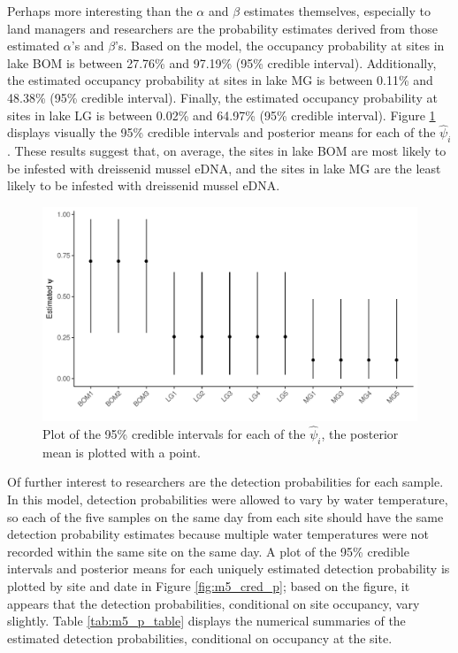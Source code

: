 \documentclass[12pt]{article}\usepackage[]{graphicx}\usepackage[]{color}
\makeatletter
\def\maxwidth{ %
  \ifdim\Gin@nat@width>\linewidth
    \linewidth
  \else
    \Gin@nat@width
  \fi
}
\newenvironment{knitrout}{}{} %
\def\maxwidth{ %
  \ifdim\Gin@nat@width>\linewidth
    \linewidth
  \else
    \Gin@nat@width
  \fi
}
\newenvironment{knitrout}{}{} %
\makeatother
\begin{document}
Perhaps more interesting than the $\alpha$ and $\beta$ estimates themselves, especially to land managers and researchers are the probability estimates derived from those estimated $\alpha$'s and $\beta$'s. Based on the model, the occupancy probability at sites in lake BOM is between 27.76\% and 97.19\% (95\% credible interval). Additionally, the estimated occupancy probability at sites in lake MG is between 0.11\% and 48.38\% (95\% credible interval). Finally, the estimated occupancy probability at sites in lake LG is between 0.02\% and 64.97\% (95\% credible interval). Figure \ref{fig:m5_cred_psi} displays visually the 95\% credible intervals and posterior means for each of the $\hat\psi_i$. These results suggest that, on average, the sites in lake BOM are most likely to be infested with dreissenid mussel eDNA, and the sites in lake MG are the least likely to be infested with dreissenid mussel eDNA.  

\begin{figure}
\begin{knitrout}
\color{fgcolor}
\includegraphics[width=\maxwidth]{figure/m5_psi-1} 

\end{knitrout}
\caption{Plot of the 95\% credible intervals for each of the $\hat\psi_i$, the posterior mean is plotted with a point.}
\label{fig:m5_cred_psi}
\end{figure}

Of further interest to researchers are the detection probabilities for each sample. In this model, detection probabilities were allowed to vary by water temperature, so each of the five samples on the same day from each site should have the same detection probability estimates because multiple water temperatures were not recorded within the same site on the same day. A plot of the 95\% credible intervals and posterior means for each uniquely estimated detection probability is plotted by site and date in Figure \ref{fig:m5_cred_p}; based on the figure, it appears that the detection probabilities, conditional on site occupancy, vary slightly. Table \ref{tab:m5_p_table} displays the numerical summaries of the estimated detection probabilities, conditional on occupancy at the site.
\end{document}
